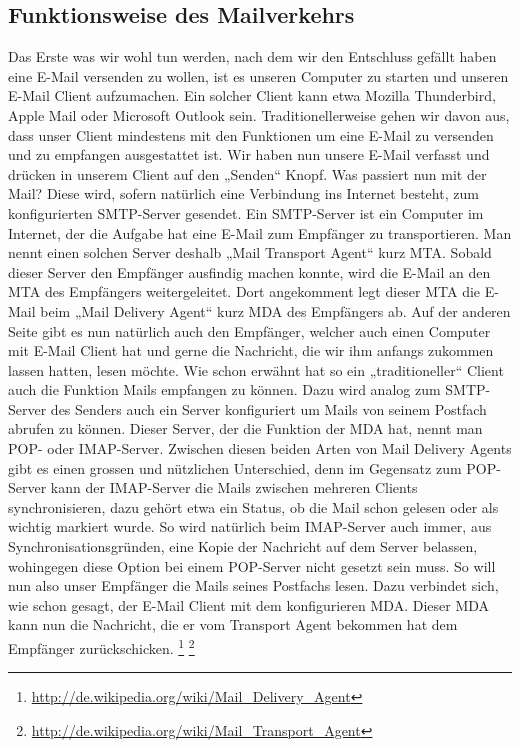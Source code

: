 \subsection{Funktionsweise des Mailverkehrs}
Das Erste was wir wohl tun werden, nach dem wir den Entschluss gefällt haben eine E-Mail versenden zu wollen, ist es unseren Computer zu starten und unseren E-Mail Client aufzumachen. Ein solcher Client kann etwa Mozilla Thunderbird, Apple Mail oder Microsoft Outlook sein. Traditionellerweise gehen wir davon aus, dass unser Client mindestens mit den Funktionen um eine E-Mail zu versenden und zu empfangen ausgestattet ist.
Wir haben nun unsere E-Mail verfasst und drücken in unserem Client auf den „Senden“ Knopf. Was passiert nun mit der Mail?
Diese wird, sofern natürlich eine Verbindung ins Internet besteht, zum konfigurierten SMTP-Server gesendet. Ein SMTP-Server ist ein Computer im Internet, der die Aufgabe hat eine E-Mail zum Empfänger zu transportieren. Man nennt einen solchen Server deshalb „Mail Transport Agent“ kurz MTA. Sobald dieser Server den Empfänger ausfindig machen konnte, wird die E-Mail an den MTA des Empfängers weitergeleitet. Dort angekomment legt dieser MTA die E-Mail beim „Mail Delivery Agent“ kurz MDA des Empfängers ab.
Auf der anderen Seite gibt es nun natürlich auch den Empfänger, welcher auch einen Computer mit E-Mail Client hat und gerne die Nachricht, die wir ihm anfangs zukommen lassen hatten, lesen möchte. Wie schon erwähnt hat so ein „traditioneller“ Client auch die Funktion Mails empfangen zu können. Dazu wird analog zum SMTP-Server des Senders auch ein Server konfiguriert um Mails von seinem Postfach abrufen zu können. Dieser Server, der die Funktion der MDA hat, nennt man POP- oder IMAP-Server. Zwischen diesen beiden Arten von Mail Delivery Agents gibt es einen grossen und nützlichen Unterschied, denn im Gegensatz zum POP-Server kann der IMAP-Server die Mails zwischen mehreren Clients synchronisieren, dazu gehört etwa ein Status, ob die Mail schon gelesen oder als wichtig markiert wurde. So wird natürlich beim IMAP-Server auch immer, aus Synchronisationsgründen, eine Kopie der Nachricht auf dem Server belassen, wohingegen diese Option bei einem POP-Server nicht gesetzt sein muss.
So will nun also unser Empfänger die Mails seines Postfachs lesen. Dazu verbindet sich, wie schon gesagt, der E-Mail Client mit dem konfigurieren MDA. Dieser MDA kann nun die Nachricht, die er vom Transport Agent bekommen hat dem Empfänger zurückschicken.
\footnote{\url{http://de.wikipedia.org/wiki/Mail_Delivery_Agent}}
\footnote{\url{http://de.wikipedia.org/wiki/Mail_Transport_Agent}}
\\

